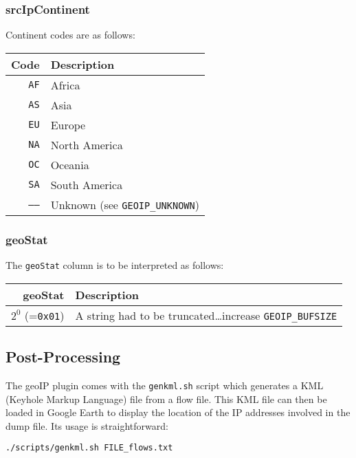 \documentclass[documentation]{subfiles}
\begin{document}
\clearpage
\subsubsection{srcIpContinent}\label{srcIpContinent}
Continent codes are as follows:
\begin{longtable}{rl}
    \toprule
    {\bf Code} & {\bf Description}\\
    \midrule\endhead%
    {\tt AF} & Africa\\
    {\tt AS} & Asia\\
    {\tt EU} & Europe\\
    {\tt NA} & North America\\
    {\tt OC} & Oceania\\
    {\tt SA} & South America\\
    {\tt --{}--} & Unknown (see {\tt GEOIP\_UNKNOWN})\\
    \bottomrule
\end{longtable}

\subsubsection{geoStat}\label{geoStat}
The {\tt geoStat} column is to be interpreted as follows:
\begin{longtable}{rl}
    \toprule
    {\bf geoStat} & {\bf Description}\\
    \midrule\endhead%
    $2^0$ (={\tt 0x01}) & A string had to be truncated\ldots increase {\tt GEOIP\_BUFSIZE}\\
    \bottomrule
\end{longtable}

\subsection{Post-Processing}

The geoIP plugin comes with the {\tt genkml.sh} script which generates a KML (Keyhole Markup Language) file from a flow file.
This KML file can then be loaded in Google Earth to display the location of the IP addresses involved in the dump file. Its usage
is straightforward:

\begin{center}
    {\tt ./scripts/genkml.sh FILE\_flows.txt}
\end{center}
\end{document}
